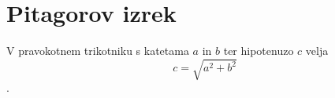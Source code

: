 \documentclass{article}
\begin{document}
\section*{Pitagorov izrek}
V pravokotnem trikotniku s katetama \(a\) in \(b\) ter hipotenuzo \(c\) velja
\[ c = \sqrt {a^2 + b^2} \].
\end{document}

